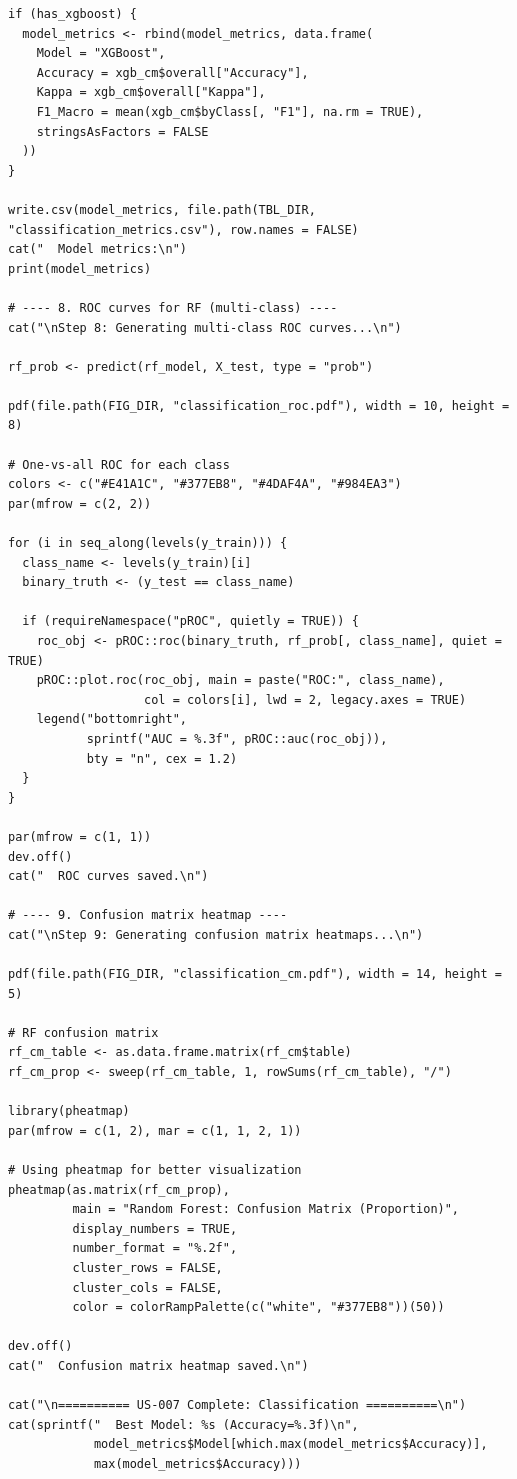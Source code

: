 \documentclass[12pt,a4paper]{ctexart}
\begin{document}
\begin{lstlisting}[caption={05_classification}, basicstyle=\ttfamily\scriptsize]
if (has_xgboost) {
  model_metrics <- rbind(model_metrics, data.frame(
    Model = "XGBoost",
    Accuracy = xgb_cm$overall["Accuracy"],
    Kappa = xgb_cm$overall["Kappa"],
    F1_Macro = mean(xgb_cm$byClass[, "F1"], na.rm = TRUE),
    stringsAsFactors = FALSE
  ))
}

write.csv(model_metrics, file.path(TBL_DIR, "classification_metrics.csv"), row.names = FALSE)
cat("  Model metrics:\n")
print(model_metrics)

# ---- 8. ROC curves for RF (multi-class) ----
cat("\nStep 8: Generating multi-class ROC curves...\n")

rf_prob <- predict(rf_model, X_test, type = "prob")

pdf(file.path(FIG_DIR, "classification_roc.pdf"), width = 10, height = 8)

# One-vs-all ROC for each class
colors <- c("#E41A1C", "#377EB8", "#4DAF4A", "#984EA3")
par(mfrow = c(2, 2))

for (i in seq_along(levels(y_train))) {
  class_name <- levels(y_train)[i]
  binary_truth <- (y_test == class_name)

  if (requireNamespace("pROC", quietly = TRUE)) {
    roc_obj <- pROC::roc(binary_truth, rf_prob[, class_name], quiet = TRUE)
    pROC::plot.roc(roc_obj, main = paste("ROC:", class_name),
                   col = colors[i], lwd = 2, legacy.axes = TRUE)
    legend("bottomright",
           sprintf("AUC = %.3f", pROC::auc(roc_obj)),
           bty = "n", cex = 1.2)
  }
}

par(mfrow = c(1, 1))
dev.off()
cat("  ROC curves saved.\n")

# ---- 9. Confusion matrix heatmap ----
cat("\nStep 9: Generating confusion matrix heatmaps...\n")

pdf(file.path(FIG_DIR, "classification_cm.pdf"), width = 14, height = 5)

# RF confusion matrix
rf_cm_table <- as.data.frame.matrix(rf_cm$table)
rf_cm_prop <- sweep(rf_cm_table, 1, rowSums(rf_cm_table), "/")

library(pheatmap)
par(mfrow = c(1, 2), mar = c(1, 1, 2, 1))

# Using pheatmap for better visualization
pheatmap(as.matrix(rf_cm_prop),
         main = "Random Forest: Confusion Matrix (Proportion)",
         display_numbers = TRUE,
         number_format = "%.2f",
         cluster_rows = FALSE,
         cluster_cols = FALSE,
         color = colorRampPalette(c("white", "#377EB8"))(50))

dev.off()
cat("  Confusion matrix heatmap saved.\n")

cat("\n========== US-007 Complete: Classification ==========\n")
cat(sprintf("  Best Model: %s (Accuracy=%.3f)\n",
            model_metrics$Model[which.max(model_metrics$Accuracy)],
            max(model_metrics$Accuracy)))
\end{lstlisting}
\end{document}
